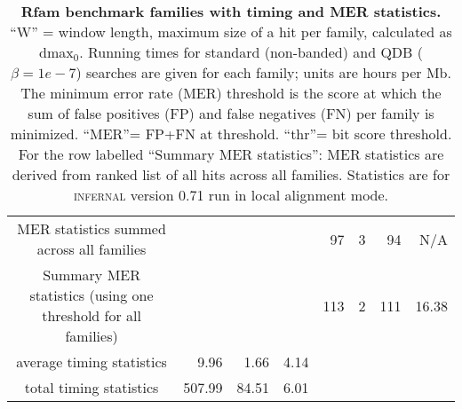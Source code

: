 \begin{table}
\begin{center}
\begin{tabular}{|ll|rr|rr|r|rr|rrrr|}
\multicolumn{6}{|c}{MER statistics summed across all families}                     & \multicolumn{3}{c|}{} & 97 & 3 & 94 & N/A \\  
\multicolumn{6}{|c}{Summary MER statistics (using one threshold for all families)} & \multicolumn{3}{c|}{} & 113 & 2 & 111 &  16.38 \\ \hline
\multicolumn{6}{|c|}{average timing statistics} & 9.96   & 1.66  & 4.14 & \multicolumn{4}{c}{} \\ 
\multicolumn{6}{|c|}{total timing statistics}   & 507.99 & 84.51 & 6.01 & \multicolumn{4}{c}{} \\ \cline{1-9}

\end{tabular}
\end{center}

\caption{\textbf{Rfam benchmark families with timing and MER statistics.}
  ``W'' = window length, maximum size of a hit per family, calculated as dmax$_0$.
  Running times for standard (non-banded) and QDB ($\beta=1e-7$) searches are given for each family; 
  units are hours per Mb. The minimum error rate (MER) threshold is the score at which the sum of false
  positives (FP) and false negatives (FN) per family is
  minimized. ``MER''= FP+FN at threshold. ``thr''= bit score threshold.
  For the row labelled ``Summary MER statistics'': MER statistics are derived from ranked list
  of all hits across all families. Statistics are for \textsc{infernal} version 0.71 run in 
  local alignment mode.}

\label{tbl:rmark}
\label{tbl:rmark}
\end{table}
